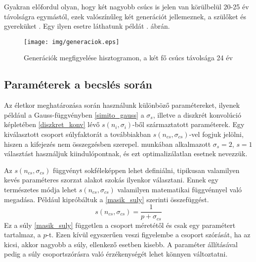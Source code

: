 \documentclass[12pt]{article}
\begin{document}
Gyakran előfordul olyan, hogy két nagyobb csúcs is jelen van körülbelül 20-25 év távolságra egymástól, ezek valószínűleg két generációt jellemeznek, a szülőket és gyereküket \cite{palchykov2012sex}. Egy ilyen esetre láthatunk példát . ábrán.
\begin{figure}[H]
	\centering
	\texttt{[image: img/generaciok.eps]}
	\caption{Generációk megfigyelése hisztogramon, a két fő csúcs távolsága 24 év}
	\label{generaciok}
\end{figure}

\iffalse
Azt is meg kell említenünk, hogy a hisztogram simítása miatt a csúcs helye eltolódhat, ha a csúcs egyik oldalán sokkal több csoport van, mint a másikon.
\begin{figure}[H]
	\centering
	\texttt{[image: img/]}
\end{figure}
\fi
\subsection{Paraméterek a becslés során} \label{parameterek_subsection}
Az életkor meghatározása során használunk különböző paramétereket, ilyenek például a Gauss-függvényben \eqref{simito_gauss} a $\sigma_s$\iffalse TODO: na jó nem biztos, hogy így szép \fi, illetve a diszkrét konvolúció képletében \eqref{diszkret_konv} lévő $s(n_i, \sigma_i)$-ből származtatott paraméterek. Egy kiválasztott csoport súlyfaktorát a továbbiakban $s(n_{cs}, \sigma_{cs})$-vel fogjuk jelölni, hiszen a kifejezés nem összegzésben szerepel.  munkában alkalmazott $\sigma_s=2$, $s=1$ választást használjuk kiindulópontnak, és
ezt optimalizálatlan esetnek nevezzük.

Az $s(n_{cs},\sigma_{cs})$ függvényt sokféleképpen lehet definiálni, tipikusan valamilyen kevés paraméteres szorzat alakot szokás ilyenkor választani.
Ennek egy természetes módja lehet $s(n_{cs},\sigma_{cs})$ valamilyen matematikai függvénnyel való megadása.
Például kipróbáltuk a \eqref{masik_suly} szerinti összefüggést.
\begin{equation} \label{masik_suly}
s(n_{cs}, \sigma_{cs}) = \frac{1}{p + \sigma_{cs}}
\end{equation}
Ez a súly \eqref{masik_suly} független a csoport méretétől és csak egy paramétert tartalmaz, a $p$-t. Ezen kívül egyszerűen veszi figyelembe a csoport szórását, ha az kicsi, akkor nagyobb a súly, ellenkező esetben kisebb. A paraméter állításával pedig a súly csoportszórásra való érzékenységét lehet könnyen változtatni.
\end{document}
